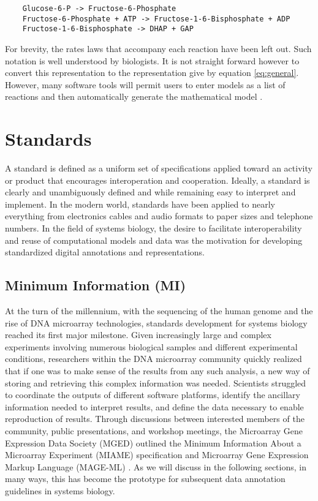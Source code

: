 \label{scheme}
\begin{verbatim}
    Glucose-6-P -> Fructose-6-Phosphate
    Fructose-6-Phosphate + ATP -> Fructose-1-6-Bisphosphate + ADP
    Fructose-1-6-Bisphosphate -> DHAP + GAP
\end{verbatim}

For brevity, the rates laws that accompany each reaction have been left
out. Such notation is well understood by biologists. It is not straight
forward however to convert this representation to the representation
give by equation \ref{eq:general}. However, many software tools will
permit users to enter models as a list of reactions and then
automatically generate the mathematical model
\autocites{SauroF91}{sauro:2000}.

\section{Standards}

A standard is defined as a uniform set of specifications applied toward
an activity or product that encourages interoperation and cooperation.
Ideally, a standard is clearly and unambiguously defined and while
remaining easy to interpret and implement. In the modern world,
standards have been applied to nearly everything from electronics cables
and audio formats to paper sizes and telephone numbers. In the field of
systems biology, the desire to facilitate interoperability and reuse of
computational models and data was the motivation for developing
standardized digital annotations and representations.

\subsection{Minimum Information (MI)}

At the turn of the millennium, with the sequencing of the human genome
and the rise of DNA microarray technologies, standards development for
systems biology reached its first major milestone. Given increasingly
large and complex experiments involving numerous biological samples and
different experimental conditions, researchers within the DNA microarray
community quickly realized that if one was to make sense of the results
from any such analysis, a new way of storing and retrieving this complex
information was needed. Scientists struggled to coordinate the outputs
of different software platforms, identify the ancillary information
needed to interpret results, and define the data necessary to enable
reproduction of results. Through discussions between interested members
of the community, public presentations, and workshop meetings, the
Microarray Gene Expression Data Society (MGED) outlined the Minimum
Information About a Microarray Experiment (MIAME) specification
\autocite{brazma2001minimum} and Microarray Gene Expression Markup
Language (MAGE-ML) \autocite{spellman2002design}. As we will discuss in
the following sections, in many ways, this has become the prototype
\autocite{quackenbush2006standardizing} for subsequent data annotation
guidelines in systems biology.

